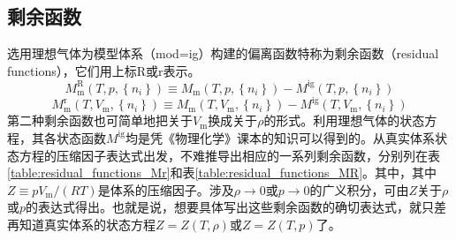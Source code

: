 \documentclass[main.tex]{subfiles}
\begin{document}
\subsection{剩余函数}
选用理想气体为模型体系（mod=ig）构建的偏离函数特称为剩余函数（residual functions），它们用上标R或r表示。
\begin{equation}\label{eq:def_residual_function_R}
    M^\text{R}_\text{m}\left(T,p,\left\{n_i\right\}\right)\equiv M_\text{m}\left(T,p,\left\{n_i\right\}\right)-M^\text{ig}\left(T,p,\left\{n_i\right\}\right)
\end{equation}
\begin{equation}\label{eq:def_residual_function_r}
    M^\text{r}_\text{m}\left(T,V_\text{m},\left\{n_i\right\}\right)\equiv M_\text{m}\left(T,V_\text{m},\left\{n_i\right\}\right)-M^\text{ig}\left(T,V_\text{m},\left\{n_i\right\}\right)
\end{equation}
第二种剩余函数也可简单地把关于$V_\text{m}$换成关于$\rho$的形式。利用理想气体的状态方程，其各状态函数$M^\text{ig}$均是凭《物理化学》课本的知识可以得到的。从真实体系状态方程的压缩因子表达式出发，不难推导出相应的一系列剩余函数，分别列在表\ref{table:residual_functions_Mr}和表\ref{table:residual_functions_MR}。其中，其中$Z\equiv pV_\text{m}/\left(RT\right)$是体系的压缩因子。涉及$\rho\rightarrow 0$或$p\rightarrow 0$的广义积分，可由$Z$关于$\rho$或$p$的表达式得出。也就是说，想要具体写出这些剩余函数的确切表达式，就只差再知道真实体系的状态方程$Z=Z\left(T,\rho\right)$或$Z=Z\left(T,p\right)$了。
\end{document}
